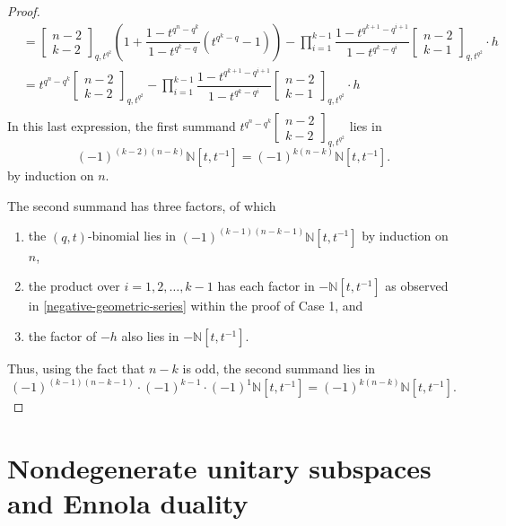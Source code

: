 \documentclass[10pt]{amsart}
\theoremstyle{plain}
\theoremstyle{definition}
\theoremstyle{remark}
\numberwithin{equation}{section}
\newcommand\qbin[3]{\left[\begin{matrix} #1 \\ #2 \end{matrix} \right]_{#3}}
\newcommand\NN{\mathbb{N}}
\begin{document}
\begin{proof}
$$\begin{aligned}
&=  \qbin{n-2}{k-2}{q,t^{q^2}} 
      \left( 1 + \dfrac{1-t^{q^{n}-q^{k}}}{1-t^{q^{k}-q}} (t^{q^{k}-q}-1) \right) -
         \prod_{i=1}^{k-1}\dfrac{1-t^{q^{k+1}-q^{i+1}}}{1-t^{q^{k}-q^{i}}} 
         \qbin{n-2}{k-1}{q,t^{q^2}}  \cdot h \\
&=  t^{q^{n}-q^{k}} \qbin{n-2}{k-2}{q,t^{q^2}} -
       \prod_{i=1}^{k-1}\dfrac{1-t^{q^{k+1}-q^{i+1}}}{1-t^{q^{k}-q^{i}}} 
         \qbin{n-2}{k-1}{q,t^{q^2}} \cdot h \\
\end{aligned}
$$
In this last expression, the first summand 
$t^{q^{n}-q^{k}}\qbin{n-2}{k-2}{q,t^{q^2}}$ lies in
$$
(-1)^{(k-2)(n-k)}\NN[t,t^{-1}]=(-1)^{k(n-k)}\NN[t,t^{-1}].
$$
by induction on $n$.

The second summand has three factors, of
which 
\begin{enumerate}
\item[$\bullet$]
the $(q,t)$-binomial lies in $(-1)^{(k-1)(n-k-1)}\NN[t,t^{-1}]$
by induction on $n$, 
\item[$\bullet$]
the product over $i=1,2,\ldots,k-1$ has
each factor in $-\NN[t,t^{-1}]$ as observed in 
\eqref{negative-geometric-series} within
the proof of Case 1, and 
\item[$\bullet$]
the factor of $-h$ also lies in $-\NN[t,t^{-1}]$.
\end{enumerate}
Thus, using the fact that $n-k$ is odd, the second summand lies in 
$$
(-1)^{(k-1)(n-k-1)} \cdot (-1)^{k-1} \cdot (-1)^1\NN[t,t^{-1}]=(-1)^{k(n-k)}\NN[t,t^{-1}].
$$
\end{proof}











\section{Nondegenerate unitary subspaces 
and Ennola duality}
\label{Ennola-section}
\end{document}
